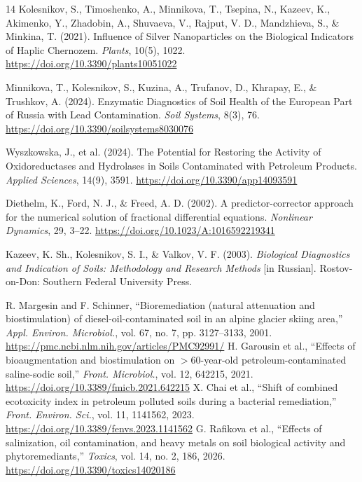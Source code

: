 \documentclass[10pt,twocolumn,a4paper]{article}
\begin{document}
\begin{thebibliography}{14}
Kolesnikov, S., Timoshenko, A., Minnikova, T., Tsepina, N., Kazeev, K., Akimenko, Y., Zhadobin, A., Shuvaeva, V., Rajput, V. D., Mandzhieva, S., \& Minkina, T. (2021). Influence of Silver Nanoparticles on the Biological Indicators of Haplic Chernozem. \textit{Plants}, 10(5), 1022. \href{https://doi.org/10.3390/plants10051022}{https://doi.org/10.3390/plants10051022}

Minnikova, T., Kolesnikov, S., Kuzina, A., Trufanov, D., Khrapay, E., \& Trushkov, A. (2024). Enzymatic Diagnostics of Soil Health of the European Part of Russia with Lead Contamination. \textit{Soil Systems}, 8(3), 76. \href{https://doi.org/10.3390/soilsystems8030076}{https://doi.org/10.3390/soilsystems8030076}

Wyszkowska, J., et al. (2024). The Potential for Restoring the Activity of Oxidoreductases and Hydrolases in Soils Contaminated with Petroleum Products. \textit{Applied Sciences}, 14(9), 3591. \href{https://doi.org/10.3390/app14093591}{https://doi.org/10.3390/app14093591}

Diethelm, K., Ford, N. J., \& Freed, A. D. (2002). A predictor-corrector approach for the numerical solution of fractional differential equations. \textit{Nonlinear Dynamics}, 29, 3--22. \href{https://doi.org/10.1023/A:1016592219341}{https://doi.org/10.1023/A:1016592219341}

Kazeev, K. Sh., Kolesnikov, S. I., \& Valkov, V. F. (2003). \textit{Biological Diagnostics and Indication of Soils: Methodology and Research Methods} [in Russian]. Rostov-on-Don: Southern Federal University Press.

 R. Margesin and F. Schinner, ``Bioremediation (natural attenuation and biostimulation) of diesel-oil-contaminated soil in an alpine glacier skiing area,'' \textit{Appl. Environ. Microbiol.}, vol. 67, no. 7, pp. 3127--3133, 2001. \url{https://pmc.ncbi.nlm.nih.gov/articles/PMC92991/}
 H. Garousin et al., ``Effects of bioaugmentation and biostimulation on $>60$-year-old petroleum-contaminated saline-sodic soil,'' \textit{Front. Microbiol.}, vol. 12, 642215, 2021. \href{https://doi.org/10.3389/fmicb.2021.642215}{https://doi.org/10.3389/fmicb.2021.642215}
 X. Chai et al., ``Shift of combined ecotoxicity index in petroleum polluted soils during a bacterial remediation,'' \textit{Front. Environ. Sci.}, vol. 11, 1141562, 2023. \href{https://doi.org/10.3389/fenvs.2023.1141562}{https://doi.org/10.3389/fenvs.2023.1141562}
 G. Rafikova et al., ``Effects of salinization, oil contamination, and heavy metals on soil biological activity and phytoremediants,'' \textit{Toxics}, vol. 14, no. 2, 186, 2026. \href{https://doi.org/10.3390/toxics14020186}{https://doi.org/10.3390/toxics14020186}
\end{thebibliography}
\end{document}
